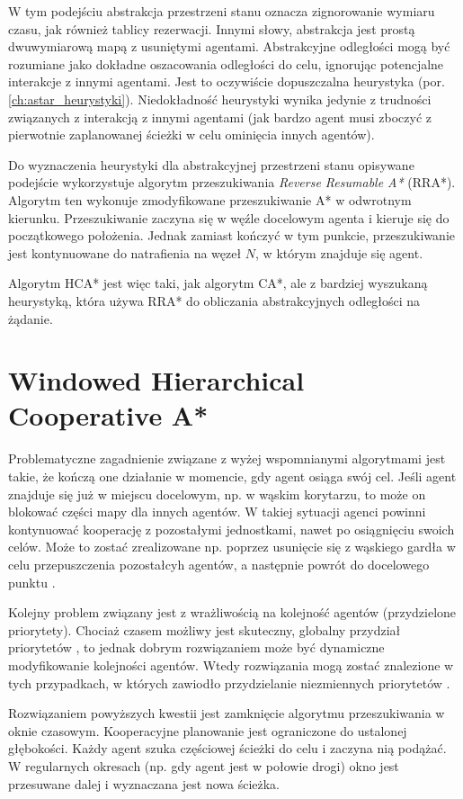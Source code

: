 W tym podejściu abstrakcja przestrzeni stanu oznacza zignorowanie wymiaru czasu, jak również tablicy rezerwacji.
Innymi słowy, abstrakcja jest prostą dwuwymiarową mapą z usuniętymi agentami. Abstrakcyjne odległości mogą być rozumiane jako dokładne oszacowania odległości do celu, ignorując potencjalne interakcje z innymi agentami. Jest to oczywiście dopuszczalna heurystyka (por. \ref{ch:astar_heurystyki}). Niedokładność heurystyki wynika jedynie z trudności związanych z interakcją z innymi agentami (jak bardzo agent musi zboczyć z pierwotnie zaplanowanej ścieżki w celu ominięcia innych agentów).

Do wyznaczenia heurystyki dla abstrakcyjnej przestrzeni stanu opisywane podejście wykorzystuje algorytm przeszukiwania {\it Reverse Resumable A*} (RRA*).
Algorytm ten wykonuje zmodyfikowane przeszukiwanie A* w odwrotnym kierunku. Przeszukiwanie zaczyna się w węźle docelowym agenta i kieruje się do początkowego położenia. Jednak zamiast kończyć w tym punkcie, przeszukiwanie jest kontynuowane do natrafienia na węzeł $N$, w którym znajduje się agent.

Algorytm HCA* jest więc taki, jak algorytm CA*, ale z bardziej wyszukaną heurystyką, która używa RRA* do obliczania abstrakcyjnych odległości na żądanie.

\section{Windowed Hierarchical Cooperative A*}
\label{ch:whca}
Problematyczne zagadnienie związane z wyżej wspomnianymi algorytmami jest takie, że kończą one działanie w momencie, gdy agent osiąga swój cel. Jeśli agent znajduje się już w miejscu docelowym, np. w wąskim korytarzu, to może on blokować części mapy dla innych agentów. W takiej sytuacji agenci powinni kontynuować kooperację z pozostałymi jednostkami, nawet po osiągnięciu swoich celów. Może to zostać zrealizowane np. poprzez usunięcie się z wąskiego gardła w celu przepuszczenia pozostałcyh agentów, a następnie powrót do docelowego punktu \cite{cooppath}.

Kolejny problem związany jest z wrażliwością na kolejność agentów (przydzielone priorytety). Chociaż czasem możliwy jest skuteczny, globalny przydział priorytetów \cite{latombe}, to jednak dobrym rozwiązaniem może być dynamiczne modyfikowanie kolejności agentów. Wtedy rozwiązania mogą zostać znalezione w tych przypadkach, w których zawiodło przydzielanie niezmiennych priorytetów \cite{cooppath}.

Rozwiązaniem powyższych kwestii jest zamknięcie algorytmu przeszukiwania w oknie czasowym.
Kooperacyjne planowanie jest ograniczone do ustalonej głębokości. Każdy agent szuka częściowej ścieżki do celu i zaczyna nią podążać. W regularnych okresach (np. gdy agent jest w połowie drogi) okno jest przesuwane dalej i wyznaczana jest nowa ścieżka.


